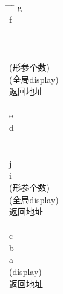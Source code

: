 \documentclass{article}
\begin{document}
\begin{tabbing}
    \hspace{1.5cm} \= \hspace{1.5cm} \= \hspace{1.5cm} \= \kill
     \> g\\

 \> f\\

 \\

 \\

 \\

 (形参个数)\\

 (全局display)\\

 \> 返回地址\\

 \\

 \> e\\

 \> d\\

 \\

 \\

 \> j\\

 \> i\\

 (形参个数)\\

 (全局display)\\

 \> 返回地址\\

 \\

 \> c\\

 \> b\\

 \> a\\

 (display)\\

 \> 返回地址\\

 \\

\end{tabbing}
\end{document}
